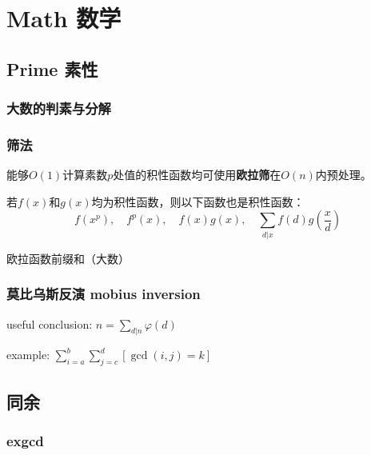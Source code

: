 
\section{Math 数学}

\subsection{Prime 素性}

\subsubsection{大数的判素与分解}




\subsubsection{筛法}

能够$O(1)$计算素数$p$处值的积性函数均可使用\textbf{欧拉筛}在$O(n)$内预处理。

若$f(x)$和$g(x)$均为积性函数，则以下函数也是积性函数：
$$
f(x^p), 
\quad f^p(x), 
\quad f(x)g(x), 
\quad \displaystyle \sum_{d | x} 
      f(d) g\left(\displaystyle \frac{x}{d}\right)
$$


欧拉函数前缀和（大数）


\subsubsection{莫比乌斯反演 mobius inversion}

useful conclusion: $n = \sum\limits_{d | n} \varphi(d)$

example: $\sum_{i = a}^{b} \sum_{j = c}^{d}[\gcd (i,j) = k]$


\subsection{同余}

\subsubsection{exgcd}

